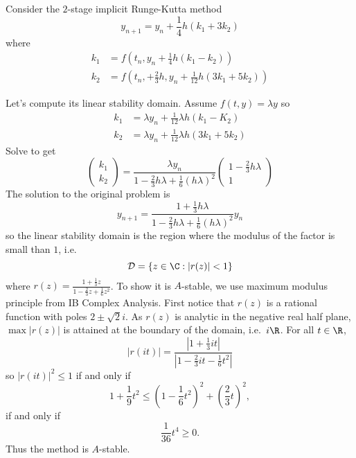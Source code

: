 \documentclass[a4paper]{article}
\begin{document}
Consider the \(2\)-stage implicit Runge-Kutta method
\[
  y_{n + 1} = y_n + \frac{1}{4}h(k_1 + 3k_2)
\]
where
\begin{align*}
  k_1 &= f(t_n, y_n + \frac{1}{4}h (k_1 - k_2)) \\
  k_2 &= f(t_n, + \frac{2}{3}h, y_n + \frac{1}{12}h (3k_1 + 5k_2))
\end{align*}

Let's compute its linear stability domain. Assume \(f(t, y) = \lambda y\) so
\begin{align*}
  k_1 &= \lambda y_n + \frac{1}{12}\lambda h (k_1 - K_2) \\
  k_2 &= \lambda y_n + \frac{1}{12}\lambda h(3k_1 + 5k_2)
\end{align*}
Solve to get
\[
  \begin{pmatrix}
    k_1 \\
    k_2
  \end{pmatrix}
  = \frac{\lambda y_n}{1 - \frac{2}{3}h \lambda + \frac{1}{6}(h\lambda)^2}
  \begin{pmatrix}
    1 - \frac{2}{3}h\lambda \\
    1
  \end{pmatrix}
\]
The solution to the original problem is
\[
  y_{n + 1} = \frac{1 + \frac{1}{3}h\lambda}{1 - \frac{2}{3}h\lambda + \frac{1}{6}(h\lambda)^2}y_n
\]
so the linear stability domain is the region where the modulus of the factor is small than \(1\), i.e.
\[
  \mathcal D = \{z \in \C: |r(z)| < 1\}
\]
where \(r(z) = \frac{1 + \frac{1}{3}z}{1 - \frac{2}{3}z + \frac{1}{6}z^2}\). To show it is \(A\)-stable, we use maximum modulus principle from IB Complex Analysis. First notice that \(r(z)\) is a rational function with poles \(2 \pm \sqrt 2 i\). As \(r(z)\) is analytic in the negative real half plane, \(\max|r(z)|\) is attained at the boundary of the domain, i.e.\ \(i\R\). For all \(t \in \R\),
\[
  |r(it)| = \frac{|1 + \frac{1}{3}it|}{|1 - \frac{2}{3}it - \frac{1}{6}t^2|}
\]
so \(|r(it)|^2 \leq 1\) if and only if
\[
  1 + \frac{1}{9}t^2 \leq (1 - \frac{1}{6}t^2)^2 + (\frac{2}{3}t)^2,
\]
if and only if
\[
  \frac{1}{36}t^4 \geq 0.
\]
Thus the method is \(A\)-stable.
\end{document}

